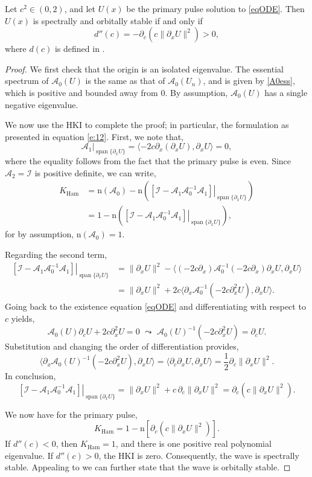 \documentclass[review,onefignum,onetabnum]{siamart171218}
\def\Ham{\mathop\mathrm{Ham}\nolimits}
\def\Span{\mathop\mathrm{span}\nolimits}
\newcommand{\rmn}{\mathrm{n}}
\newcommand{\calA}{\mathcal{A}}
\newcommand{\calI}{\mathcal{I}}
\begin{document}
\begin{lemma}\label{qstable}
Let $c^2 \in (0, 2)$, and let $U(x)$ be the primary pulse solution to \cref{eqODE}. Then $U(x)$ is spectrally and orbitally stable if and only if
\[
d''(c) = -\partial_c\left( c\|\partial_xU\|^2 \right)>0,
\]
where $d(c)$ is defined in \cite[equation (2.16)]{grillakis:sto87}.
\end{lemma}

\begin{proof}
We first check that the origin is an isolated eigenvalue. The essential spectrum of $\calA_0(U)$ is the same as that of $\calA_0(U_n)$, and is given by \cref{A0ess}, which is positive and bounded away from 0. By assumption, $\calA_0(U)$ has a single negative eigenvalue.

We now use the HKI to complete the proof; in particular, the formulation as presented in equation \cref{e:12}. First, we note that,
\[
\left.\calA_1\right|_{\Span\{\partial_xU\}}=
\langle-2c\partial_x\left(\partial_xU\right),\partial_xU\rangle=0,
\]
where the equality follows from the fact that the primary pulse is even. Since $\calA_2=\calI$ is positive definite, we can write,
\[
\begin{aligned}
K_{\Ham}&=\rmn(\calA_0)-
\rmn\left(\left.\left[\calI-\calA_1\calA_0^{-1}\calA_1\right]\right|_{\Span\{\partial_xU\}}\right)\\
&=1-
\rmn\left(\left.\left[\calI-\calA_1\calA_0^{-1}\calA_1\right]\right|_{\Span\{\partial_xU\}}\right),
\end{aligned}
\]
for by assumption, $\rmn(\calA_0)=1$.

Regarding the second term,
\[
\begin{aligned}
\left.\left[\calI-\calA_1\calA_0^{-1}\calA_1\right]\right|_{\Span\{\partial_xU\}}&=
\|\partial_xU\|^2-
\langle(-2c\partial_x)\calA_0^{-1}(-2c\partial_x)\partial_xU,\partial_xU\rangle\\
&=\|\partial_xU\|^2+
2c\langle\partial_x\calA_0^{-1}(-2c\partial_x^2U),\partial_xU\rangle.
\end{aligned}
\]
Going back to the existence equation \cref{eqODE} and differentiating with respect to $c$ yields,
\[
\calA_0(U)\partial_cU+2c\partial_x^2U=0\,\,\leadsto\,\,
\calA_0(U)^{-1}(-2c\partial_x^2U)=\partial_cU.
\]
Substitution and changing the order of differentiation provides,
\[
\langle\partial_x\calA_0(U)^{-1}(-2c\partial_x^2U),\partial_xU\rangle=
\langle\partial_c\partial_xU,\partial_xU\rangle=\frac{1}{2}\partial_c\|\partial_xU\|^2.
\]
In conclusion,
\[
\left.\left[\calI-\calA_1\calA_0^{-1}\calA_1\right]\right|_{\Span\{\partial_xU\}}=
\|\partial_xU\|^2+c\,\partial_c\|\partial_xU\|^2=
\partial_c\left( c\|\partial_xU\|^2 \right).
\]

We now have for the primary pulse,
\[
K_{\Ham}=1-\rmn\left[\partial_c\left( c\|\partial_xU\|^2 \right)\right].
\]
If $d''(c)<0$, then $K_{\Ham}=1$, and there is one positive real polynomial eigenvalue. If $d''(c)>0$, the HKI is zero. Consequently, the wave is spectrally stable. Appealing to \cite[Theorem~4.1]{bronski:aii14} we can further state that the wave is orbitally stable.
\end{proof}
\end{document}
